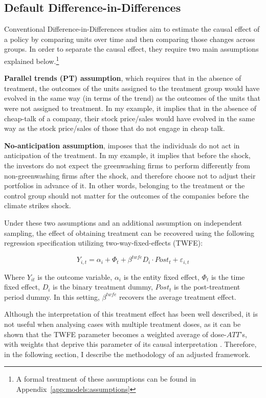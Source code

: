 \documentclass[12pt]{article}
\begin{document}
\subsection{Default Difference-in-Differences}

Conventional Difference-in-Differences studies aim to estimate the causal effect of a policy by comparing units over time and then comparing those changes across groups. In order to separate the causal effect, they require two main assumptions explained below.\footnote{A formal treatment of these assumptions can be found in Appendix~\ref{app:models:assumptions}} 

\textbf{Parallel trends (PT) assumption}, which requires that in the absence of treatment, the outcomes of the units assigned to the treatment group would have evolved in the same way (in terms of the trend) as the outcomes of the units that were not assigned to treatment. In my example, it implies that in the absence of cheap-talk of a company, their stock price/sales would have evolved in the same way as the stock price/sales of those that do not engage in cheap talk. 

\textbf{No-anticipation assumption}, imposes that the individuals do not act in anticipation of the treatment. In my example, it implies that before the shock, the investors do not expect the greenwashing firms to perform differently from non-greenwashing firms after the shock, and therefore choose not to adjust their portfolios in advance of it. In other words, belonging to the treatment or the control group should not matter for the outcomes of the companies before the climate strikes shock.

Under these two assumptions and an additional assumption on independent sampling, the effect of obtaining treatment can be recovered using the following regression specification utilizing two-way-fixed-effects (TWFE):

\begin{equation}
    Y_{i,t} = \alpha_i + \Phi_t + \beta^{twfe} D_{i} \cdot Post_{t} + \varepsilon_{i,t}
\end{equation}

Where $Y_{it}$ is the outcome variable, $\alpha_i$ is the entity fixed effect, $\Phi_t$ is the time fixed effect, $D_i$ is the binary treatment dummy, $Post_t$ is the post-treatment period dummy. In this setting, $\beta^{twfe}$ recovers the average treatment effect.

Although the interpretation of this treatment effect has been well described, it is not useful when analysing cases with multiple treatment doses, as it can be shown that the TWFE parameter becomes a weighted average of dose-$ATT$'s, with weights that deprive this parameter of its causal interpretation \parencite{callawayDifferenceinDifferencesContinuousTreatment2025}. Therefore, in the following section, I describe the methodology of an adjusted framework.
\end{document}
